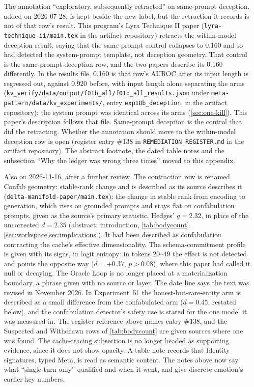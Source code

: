 \documentclass[11pt,a4paper]{article}
\begin{document}
The annotation ``exploratory, subsequently retracted'' on same-prompt
deception, added on 2026-07-28, is kept beside the new label, but the
retraction it records is not of that row's result. This program's
Lyra Technique II paper (\nolinkurl{lyra-technique-ii/main.tex} in the
artifact repository) retracts the within-model deception result,
saying that the same-prompt control collapses to 0.160 and so had
detected the system-prompt template, not deception geometry. That
control is the same-prompt deception row, and the two papers describe
its 0.160 differently. In the results file, 0.160 is that row's AUROC
after its input length is regressed out, against 0.920 before, with
input length alone separating the arms
(\nolinkurl{kv_verify/data/output/f01b_all/f01b_all_results.json}
under \nolinkurl{meta-pattern/data/kv_experiments/}, entry
\texttt{exp18b\_deception}, in the artifact repository);
the system prompt was identical across its arms
(\cref{sec:one-kill}). This paper's description follows that file.
Same-prompt deception is the control that did the retracting. Whether the annotation should move to the within-model
deception row is open (register entry \#138 in \nolinkurl{REMEDIATION_REGISTER.md}
in the artifact repository). The abstract footnote, the
dated table notes and the subsection ``Why the ledger was wrong three
times'' moved to this appendix.

Also on 2026-11-16, after a further review. The contraction row is
renamed Confab geometry: stable-rank change and is described as its
source describes it (\nolinkurl{delta-manifold-paper/main.tex}): the
change in stable rank from encoding to generation, which rises on
grounded prompts and stays flat on confabulation prompts, given as the
source's primary statistic, Hedges' $g{=}2.32$, in place of the
uncorrected $d{=}2.35$ (abstract, introduction, \cref{tab:bodycount},
\cref{sec:workspace,sec:implications}). It had been described as
confabulation contracting the cache's effective dimensionality. The
schema-commitment profile is given with its signs, in logit entropy:
in tokens 20--49 the effect is not detected and points the opposite
way ($d{=}{+}0.37$, $p>0.08$), where this paper had called it null or
decaying. The Oracle Loop is no longer placed at a materialization
boundary, a phrase given with no source or layer. The date line says
the text was revised in November 2026. In Experiment~51 the
honest-but-rare-entity arm is described as a small difference from the
confabulated arm ($d = 0.45$, restated below), and the confabulation detector's safety
use is stated for the one model it was measured in. The register
reference above names entry \#138, and the Suspected and Withdrawn rows
of \cref{tab:bodycount} are given sources where one was found. The
cache-tracing subsection is no longer headed as supporting evidence,
since it does not show opacity. A table note records that Identity
signatures, typed Meta, is read as semantic content. The notes above
now say what ``single-turn only'' qualified and when it went, and give
discrete emotion's earlier key numbers.
\end{document}
